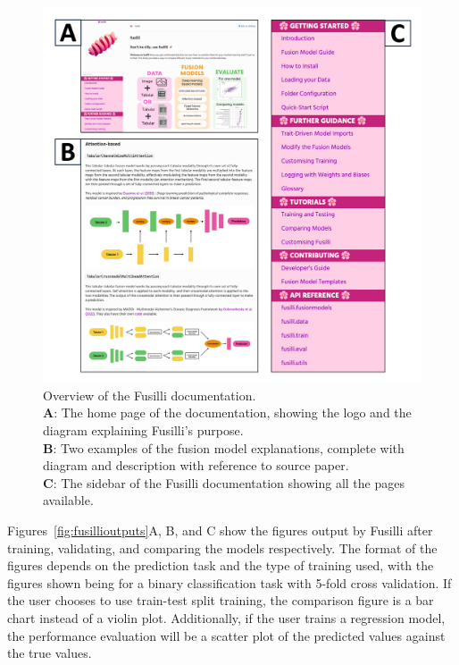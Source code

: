 \begin{figure}
    \centering
    \includegraphics[width=1\linewidth]{figures/fusilli_documentation}
    \caption{Overview of the Fusilli documentation. \\
    \textbf{A}: The home page of the documentation, showing the logo and the diagram explaining Fusilli's purpose.\\
    \textbf{B}: Two examples of the fusion model explanations, complete with diagram and description with reference to source paper. \\
    \textbf{C}: The sidebar of the Fusilli documentation showing all the pages available.
    }
    \label{fig:fusillidocs}
\end{figure}

Figures~\ref{fig:fusillioutputs}A, B, and C show the figures output by Fusilli after training, validating, and comparing the models respectively.
The format of the figures depends on the prediction task and the type of training used, with the figures shown being for a binary classification task with 5-fold cross validation.
If the user chooses to use train-test split training, the comparison figure is a bar chart instead of a violin plot.
Additionally, if the user trains a regression model, the performance evaluation will be a scatter plot of the predicted values against the true values.


